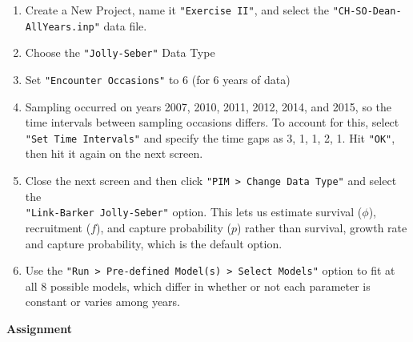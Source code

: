 \documentclass[12pt]{article}
\begin{document}
\begin{enumerate}
  \item Create a New Project, name it \verb+"Exercise II"+, and select
    the \verb+"CH-SO-Dean-AllYears.inp"+ data file.
  \item Choose the \verb+"Jolly-Seber"+ Data Type
  \item Set \verb+"Encounter Occasions"+ to 6 (for 6 years of data)
  \item Sampling occurred on years 2007, 2010, 2011, 2012, 2014, and
    2015, so the time intervals between sampling occasions differs. To
    account for this, select \verb+"Set Time Intervals"+ and specify the
    time gaps as 3, 1, 1, 2, 1. Hit \verb+"OK"+, then hit it again on
    the next screen.
  \item Close the next screen and then click
    \verb+"PIM > Change Data Type"+ and select the \\
    \verb+"Link-Barker Jolly-Seber"+ option. This lets us estimate
    survival ($\phi$), recruitment ($f$), and capture probability
    ($p$) rather than survival, growth rate and capture probability,
    which is the default option. 
  \item Use the \verb+"Run > Pre-defined Model(s) > Select Models"+
    option to fit at all 8 possible models, which differ in whether or
    not each parameter is constant or varies among years.
\end{enumerate}






{\bf Assignment}
\end{document}
